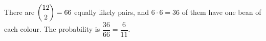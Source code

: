 There are $\dbinom{12}{2}=66$ equally likely pairs, and $6\cdot6=36$ of them have one bean of each colour. The probability is $\dfrac{36}{66}=\boxed{\dfrac{6}{11}}$.
